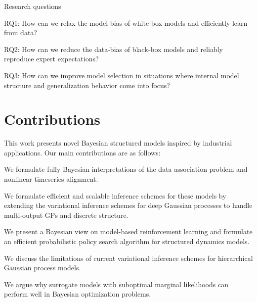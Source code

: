 \begin{titledesc}{Research questions}
    \item[RQ1:] How can we relax the model-bias of white-box models and efficiently learn from data?
    \item[RQ2:] How can we reduce the data-bias of black-box models and reliably reproduce expert expectations?
    \item[RQ3:] How can we improve model selection in situations where internal model structure and generalization behavior come into focus?
\end{titledesc}


\section{Contributions}
This work presents novel Bayesian structured models inspired by industrial applications.
Our main contributions are as follows:
\begin{compactitem}
    \item We formulate fully Bayesian interpretations of the data association problem and nonlinear timeseries alignment.
    \item We formulate efficient and scalable inference schemes for these models by extending the variational inference schemes for deep Gaussian processes to handle multi-output GPs and discrete structure.
    \item We present a Bayesian view on model-based reinforcement learning and formulate an efficient probabilistic policy search algorithm for structured dynamics models.
    \item We discuss the limitations of current variational inference schemes for hierarchical Gaussian process models.
    \item We argue why surrogate models with suboptimal marginal likelihoods can perform well in Bayesian optimization problems.
\end{compactitem}

